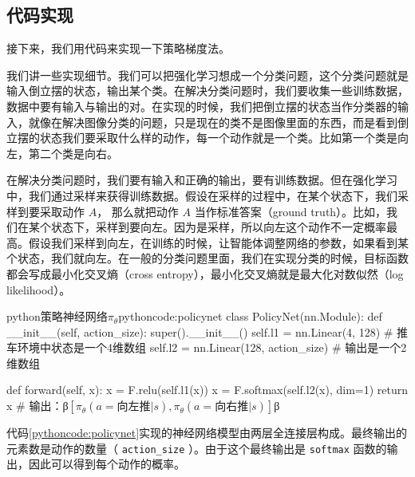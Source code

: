 \documentclass[lang=cn,newtx,10pt,scheme=chinese]{elegantbook}
\newcommand{\py}[1]{%
  \colorbox{gray!10}{\texttt{#1}}%
}
\begin{document}
\subsection{代码实现}

接下来，我们用代码来实现一下策略梯度法。

我们讲一些实现细节。我们可以把强化学习想成一个分类问题，这个分类问题就是输入倒立摆的状态，输出某个类。在解决分类问题时，我们要收集一些训练数据，数据中要有输入与输出的对。在实现的时候，我们把倒立摆的状态当作分类器的输入，就像在解决图像分类的问题，只是现在的类不是图像里面的东西，而是看到倒立摆的状态我们要采取什么样的动作，每一个动作就是一个类。比如第一个类是向左，第二个类是向右。

在解决分类问题时，我们要有输入和正确的输出，要有训练数据。但在强化学习中，我们通过采样来获得训练数据。假设在采样的过程中，在某个状态下，我们采样到要采取动作 $A$， 那么就把动作 $A$ 当作标准答案（ground truth）。比如，我们在某个状态下，采样到要向左。因为是采样，所以向左这个动作不一定概率最高。假设我们采样到向左，在训练的时候，让智能体调整网络的参数，如果看到某个状态，我们就向左。在一般的分类问题里面，我们在实现分类的时候，目标函数都会写成最小化交叉熵（cross entropy），最小化交叉熵就是最大化对数似然（log likelihood）。


\begin{codebox}{python}{策略神经网络$\pi_\theta$}{pythoncode:policynet}
class PolicyNet(nn.Module):
    def __init__(self, action_size):
        super().__init__()
        self.l1 = nn.Linear(4, 128) # 推车环境中状态是一个4维数组
        self.l2 = nn.Linear(128, action_size) # 输出是一个2维数组

    def forward(self, x):
        x = F.relu(self.l1(x))
        x = F.softmax(self.l2(x), dim=1)
        return x # 输出：β$[\pi_\theta(a=\text{向左推}|s),\pi_\theta(a=\text{向右推}|s)]$β
\end{codebox}

代码\ref{pythoncode:policynet}实现的神经网络模型由两层全连接层构成。最终输出的元素数是动作的数量（\py{action_size}）。由于这个最终输出是\py{softmax}函数的输出，因此可以得到每个动作的概率。
\end{document}
